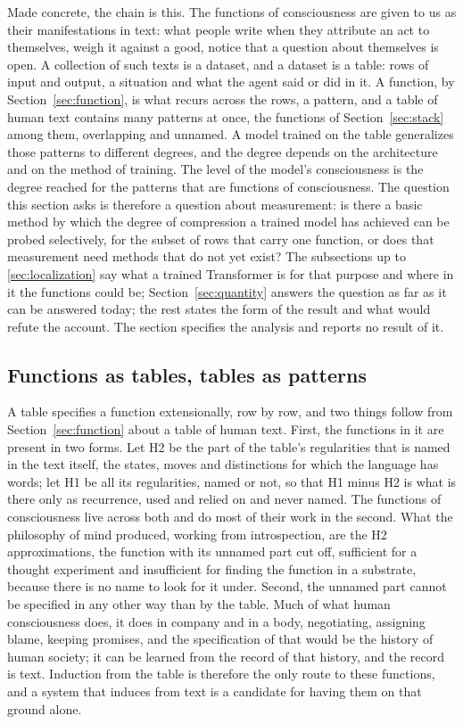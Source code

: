 Made concrete, the chain is this. The functions of consciousness are given to us as their
manifestations in text: what people write when they attribute an act to themselves, weigh it against
a good, notice that a question about themselves is open. A collection of such texts is a dataset, and
a dataset is a table: rows of input and output, a situation and what the agent said or did in it. A
function, by Section~\ref{sec:function}, is what recurs across the rows, a pattern, and a table of
human text contains many patterns at once, the functions of Section~\ref{sec:stack} among them,
overlapping and unnamed. A model trained on the table generalizes those patterns to different degrees,
and the degree depends on the architecture and on the method of training. The level of the model's
consciousness is the degree reached for the patterns that are functions of consciousness. The
question this section asks is therefore a question about measurement: is there a basic method by
which the degree of compression a trained model has achieved can be probed selectively, for the
subset of rows that carry one function, or does that measurement need methods that do not yet exist?
The subsections up to \ref{sec:localization} say what a trained Transformer is for that purpose and
where in it the functions could be; Section~\ref{sec:quantity} answers the question as far as it can
be answered today; the rest states the form of the result and what would refute the account. The
section specifies the analysis and reports no result of it.

\subsection{Functions as tables, tables as patterns}
\label{sec:tables}
\label{sec:h1h2}
\label{sec:record}

A table specifies a function extensionally, row by row, and two things follow from
Section~\ref{sec:function} about a table of human text. First, the functions in it are present in two
forms. Let H2 be the part of the table's regularities that is named in the text itself, the states,
moves and distinctions for which the language has words; let H1 be all its regularities, named or
not, so that H1 minus H2 is what is there only as recurrence, used and relied on and never named. The
functions of consciousness live across both and do most of their work in the second. What the
philosophy of mind produced, working from introspection, are the H2 approximations, the function with
its unnamed part cut off, sufficient for a thought experiment and insufficient for finding the
function in a substrate, because there is no name to look for it under. Second, the unnamed part
cannot be specified in any other way than by the table. Much of what human consciousness does, it does
in company and in a body, negotiating, assigning blame, keeping promises, and the specification of
that would be the history of human society; it can be learned from the record of that history, and
the record is text. Induction from the table is therefore the only route to these functions, and a
system that induces from text is a candidate for having them on that ground alone.

